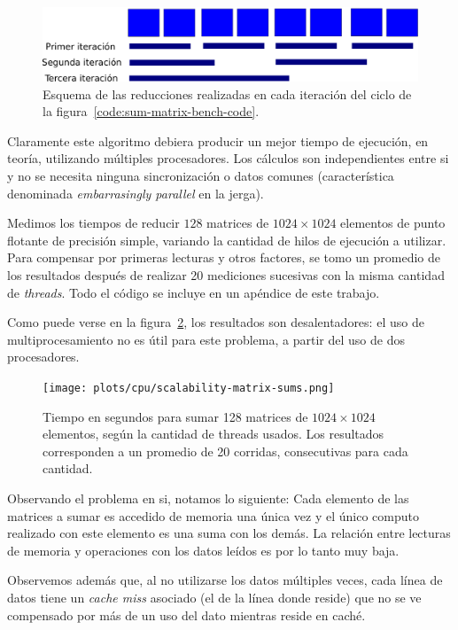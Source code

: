 \begin{figure}[htbp]
   \centering
   \includegraphics[width=\plotwidth]{images/reductions.png}
   \caption{Esquema de las reducciones realizadas en cada iteraci\'on del ciclo de la
   figura~\ref{code:sum-matrix-bench-code}.}
   \label{fig:sum-matrix-bench-reduce}
\end{figure}

Claramente este algoritmo debiera producir un mejor tiempo de ejecuci\'on, en
teor\'ia, utilizando m\'ultiples procesadores. Los c\'alculos son independientes
entre si y no se necesita ninguna sincronizaci\'on o datos comunes (caracter\'istica
denominada \textit{embarrasingly parallel} en la jerga).

Medimos los tiempos de reducir $128$ matrices de $1024 \times 1024$ elementos de punto
flotante de precisi\'on simple, variando la cantidad de hilos de ejecuci\'on a
utilizar. Para compensar por primeras lecturas y otros factores, se tomo un promedio
de los resultados despu\'es de realizar 20 mediciones sucesivas con la misma
cantidad de \textit{threads}. Todo el c\'odigo se incluye en un ap\'endice de este
trabajo.

Como puede verse en la figura~\ref{fig:sum-matrix-bench-result}, los resultados
son desalentadores: el uso de multiprocesamiento no es \'util para este problema,
a partir del uso de dos procesadores.

\begin{figure}[htbp]
   \centering
   \texttt{[image: plots/cpu/scalability-matrix-sums.png]}
   \caption{Tiempo en segundos para sumar 128 matrices de $1024 \times 1024$
   elementos, seg\'un la cantidad de threads usados. Los resultados corresponden
   a un promedio de 20 corridas, consecutivas para cada cantidad.}
   \label{fig:sum-matrix-bench-result}
\end{figure}

Observando el problema en si, notamos lo siguiente: Cada elemento de las
matrices a sumar es accedido de memoria una \'unica vez y el \'unico computo
realizado con este elemento es una suma con los dem\'as. La relaci\'on entre
lecturas de memoria y operaciones con los datos le\'idos es por lo tanto muy baja.

Observemos adem\'as que, al no utilizarse los datos m\'ultiples veces, cada l\'inea
de datos tiene un \textit{cache miss} asociado (el de la l\'inea donde reside) que
no se ve compensado por m\'as de un uso del dato mientras reside en cach\'e.

